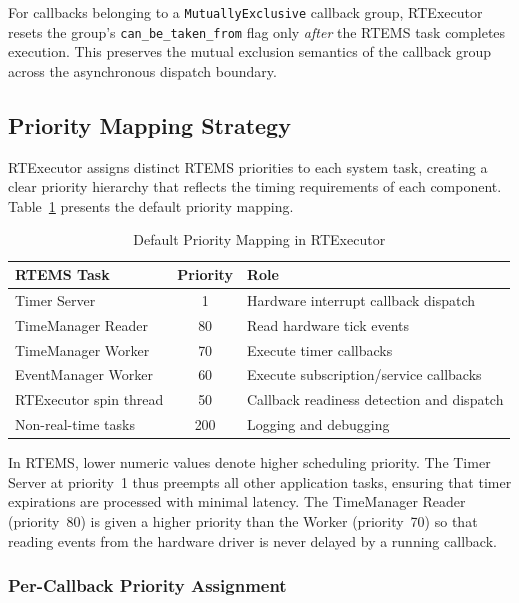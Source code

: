 For callbacks belonging to a \texttt{MutuallyExclusive} callback group, RTExecutor resets the group's \texttt{can\_be\_taken\_from} flag only \emph{after} the RTEMS task completes execution.  This preserves the mutual exclusion semantics of the callback group across the asynchronous dispatch boundary.

\subsection{Priority Mapping Strategy}

RTExecutor assigns distinct RTEMS priorities to each system task, creating a clear priority hierarchy that reflects the timing requirements of each component.  Table~\ref{tab:priority} presents the default priority mapping.

\begin{table}[t]
\centering
\caption{Default Priority Mapping in RTExecutor}
\label{tab:priority}
\begin{tabular}{l|c|l}
\hline
\textbf{RTEMS Task} & \textbf{Priority} & \textbf{Role} \\
\hline
\hline
Timer Server & 1 & Hardware interrupt callback dispatch \\
\hline
TimeManager Reader & 80 & Read hardware tick events \\
\hline
TimeManager Worker & 70 & Execute timer callbacks \\
\hline
EventManager Worker & 60 & Execute subscription/service callbacks \\
\hline
RTExecutor spin thread & 50 & Callback readiness detection and dispatch \\
\hline
Non-real-time tasks & 200 & Logging and debugging \\
\hline
\end{tabular}
\end{table}

In RTEMS, lower numeric values denote higher scheduling priority.  The Timer Server at priority~1 thus preempts all other application tasks, ensuring that timer expirations are processed with minimal latency.  The TimeManager Reader (priority~80) is given a higher priority than the Worker (priority~70) so that reading events from the hardware driver is never delayed by a running callback.

\subsubsection{Per-Callback Priority Assignment}

